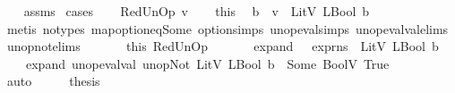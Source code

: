 \begin{isabellebody}
%
\isadelimproof
\ \ %
\endisadelimproof
%
\isatagproof
{}\isamarkupfalse%
\ assms\isanewline
{}\isamarkupfalse%
\ cases\isanewline
\ \ \isamarkupfalse%
\ {\isacharparenleft}{\kern0pt}RedUnOp\ v{\isacharparenright}{\kern0pt}\isanewline
\ \ \isamarkupfalse%
\ this\ \isamarkupfalse%
\ b{}\ \ {\isachardoublequoteopen}v\ {\isacharequal}{\kern0pt}\ LitV\ {\isacharparenleft}{\kern0pt}LBool\ b{}{\isacharparenright}{\kern0pt}{\isachardoublequoteclose}\isanewline
\ \ \ \ \isamarkupfalse%
\ {\isacharparenleft}{\kern0pt}metis\ {\isacharparenleft}{\kern0pt}no{\isacharunderscore}{\kern0pt}types{\isacharparenright}{\kern0pt}\ map{\isacharunderscore}{\kern0pt}option{\isacharunderscore}{\kern0pt}eq{\isacharunderscore}{\kern0pt}Some\ option{\isachardot}{\kern0pt}simps{\isacharparenleft}{\kern0pt}{}{\isacharparenright}{\kern0pt}\ unop{\isacharunderscore}{\kern0pt}eval{\isachardot}{\kern0pt}simps{\isacharparenleft}{\kern0pt}{}{\isacharparenright}{\kern0pt}\ unop{\isacharunderscore}{\kern0pt}eval{\isacharunderscore}{\kern0pt}val{\isachardot}{\kern0pt}elims\ unop{\isacharunderscore}{\kern0pt}not{\isachardot}{\kern0pt}elims{\isacharparenright}{\kern0pt}\ \ \ \isanewline
\ \ \isamarkupfalse%
\ this\ RedUnOp\ \isamarkupfalse%
\ \isanewline
\ \ \ \ expand{}{\isacharcolon}{\kern0pt}\ {\isachardoublequoteopen}{\isasymLambda}{\isacharcomma}{\kern0pt}{\isasymGamma}{\isacharcomma}{\kern0pt}{\isasymOmega}\ {\isasymturnstile}\ {\isasymlangle}expr{\isacharcomma}{\kern0pt}ns{}{\isasymrangle}\ {\isasymDown}\ {\isacharparenleft}{\kern0pt}LitV\ {\isacharparenleft}{\kern0pt}LBool\ b{}{\isacharparenright}{\kern0pt}{\isacharparenright}{\kern0pt}{\isachardoublequoteclose}\ \ \isanewline
\ \ \ \ expand{}{\isacharcolon}{\kern0pt}\ {\isachardoublequoteopen}unop{\isacharunderscore}{\kern0pt}eval{\isacharunderscore}{\kern0pt}val\ unop{\isachardot}{\kern0pt}Not\ {\isacharparenleft}{\kern0pt}LitV\ {\isacharparenleft}{\kern0pt}LBool\ b{}{\isacharparenright}{\kern0pt}{\isacharparenright}{\kern0pt}\ {\isacharequal}{\kern0pt}\ Some\ {\isacharparenleft}{\kern0pt}BoolV\ True{\isacharparenright}{\kern0pt}{\isachardoublequoteclose}\isanewline
\ \ \ \ \isamarkupfalse%
\ auto\isanewline
\ \ \isamarkupfalse%
\ \isamarkupfalse%
\ {\isacharquery}{\kern0pt}thesis\ \isamarkupfalse%

\end{isabellebody}
